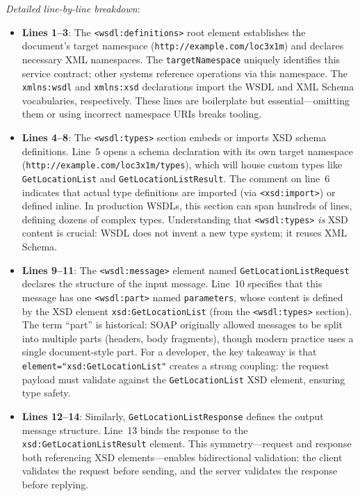 \documentclass[11pt]{article}
\begin{document}
\noindent\emph{Detailed line-by-line breakdown}:
\begin{itemize}
  \item \textbf{Lines 1--3}: The \texttt{<wsdl:definitions>} root element establishes the document's target namespace (\texttt{http://example.com/loc3x1m}) and declares necessary XML namespaces. The \texttt{targetNamespace} uniquely identifies this service contract; other systems reference operations via this namespace. The \texttt{xmlns:wsdl} and \texttt{xmlns:xsd} declarations import the WSDL and XML Schema vocabularies, respectively. These lines are boilerplate but essential—omitting them or using incorrect namespace URIs breaks tooling.
  
  \item \textbf{Lines 4--8}: The \texttt{<wsdl:types>} section embeds or imports XSD schema definitions. Line~5 opens a schema declaration with its own target namespace (\texttt{http://example.com/loc3x1m/types}), which will house custom types like \texttt{GetLocationList} and \texttt{GetLocationListResult}. The comment on line~6 indicates that actual type definitions are imported (via \texttt{<xsd:import>}) or defined inline. In production WSDLs, this section can span hundreds of lines, defining dozens of complex types. Understanding that \texttt{<wsdl:types>} \emph{is} XSD content is crucial: WSDL does not invent a new type system; it reuses XML Schema.
  
  \item \textbf{Lines 9--11}: The \texttt{<wsdl:message>} element named \texttt{GetLocationListRequest} declares the structure of the input message. Line~10 specifies that this message has one \texttt{<wsdl:part>} named \texttt{parameters}, whose content is defined by the XSD element \texttt{xsd:GetLocationList} (from the \texttt{<wsdl:types>} section). The term ``part'' is historical: SOAP originally allowed messages to be split into multiple parts (headers, body fragments), though modern practice uses a single document-style part. For a developer, the key takeaway is that \texttt{element="xsd:GetLocationList"} creates a strong coupling: the request payload must validate against the \texttt{GetLocationList} XSD element, ensuring type safety.
  
  \item \textbf{Lines 12--14}: Similarly, \texttt{GetLocationListResponse} defines the output message structure. Line~13 binds the response to the \texttt{xsd:GetLocationListResult} element. This symmetry—request and response both referencing XSD elements—enables bidirectional validation: the client validates the request before sending, and the server validates the response before replying.
  

\end{itemize}
\end{document}
